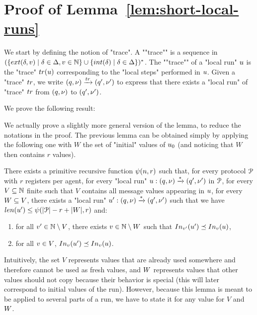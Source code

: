 \section{Proof of Lemma~\ref{lem:short-local-runs}}
\label{app:tower-lemma}

	We start by defining the notion of "trace". 
	\AP A ""trace"" is a sequence in $(\set{\extlabel{\atrans}{\aval} \mid \atrans \in \transitions, \aval \in \nats} \cup \set{\intlabel{\atrans} \mid \atrans \in \transitions})^*$. The ""trace"" of a "local run" $u$ is the "trace" $\trace{\localrun}$ corresponding to the "local steps" performed in $u$. Given a "trace" $\atrace$, we write $(q,\localdata) \step{\atrace} (q',\localdata')$ to express that there exists a "local run" of "trace" $\atrace$ from $(q,\nu)$ to $(q',\nu')$. 
	
	

We prove the following result:

\lemShortLocalRuns*

We actually prove a slightly more general version of the lemma, to reduce the notations in the proof. The previous lemma can be obtained simply by applying the following one with $W$ the set of "initial" values of $u_0$ (and noticing that $W$ then contains $r$ values).

\begin{lemma}
	There exists a primitive recursive function $\psi(n,r)$ such that, for every protocol $\mathcal{P}$ with $r$ registers per agent, for every "local run" $u: (q, \nu) \xrightarrow{*} (q', \nu')$ in $\mathcal{P}$, for every $V \subseteq \mathbb{N}$ finite such that $V$ contains all message values appearing in $u$,  for every $W \subseteq V$, there exists a "local run" $u': (q, \nu) \xrightarrow{*} (q', \nu')$ such that we have $\length{\localrun'} \leq \towerfun(\size{\prot} -r + \size{\Vinit},r)$ and:
	\begin{enumerate}
		\item \label{item:shorterrun_anyvalue} for all $v' \in \mathbb{N} \setminus V$, there exists $v \in \mathbb{N} \setminus W$ such that $\vinput{\aval'}{\localrun'} \subword \vinput{\aval}{\localrun}$,
		\item \label{item:shorterrun_oldvalues} for all $v \in V$, $\vinput{\aval}{\localrun'} \subword \vinput{\aval}{\localrun}$. 
	\end{enumerate}
\end{lemma}

Intuitively, the set $V$ represents values that are already used somewhere and therefore cannot be used as fresh values, and $W$ represents values that other values should not copy because their behavior is special (this will later correspond to initial values of the run). However, because this lemma is meant to be applied to several parts of a run, we have to state it for any value for $V$ and $W$.  

